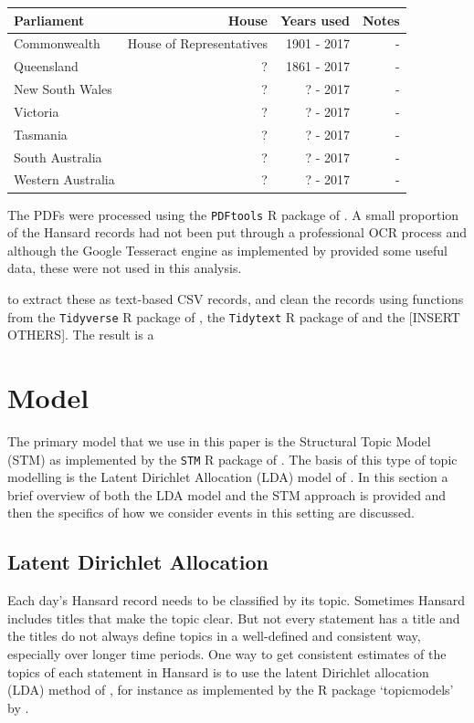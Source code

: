 \documentclass[12pt,]{article}
\begin{document}
\begin{longtable}[]{@{}lrrr@{}}
\toprule
Parliament & House & Years used & Notes\tabularnewline
\midrule
\endhead
Commonwealth & House of Representatives & 1901 - 2017 & -\tabularnewline
Queensland & ? & 1861 - 2017 & -\tabularnewline
New South Wales & ? & ? - 2017 & -\tabularnewline
Victoria & ? & ? - 2017 & -\tabularnewline
Tasmania & ? & ? - 2017 & -\tabularnewline
South Australia & ? & ? - 2017 & -\tabularnewline
Western Australia & ? & ? - 2017 & -\tabularnewline
\bottomrule
\end{longtable}

The PDFs were processed using the \texttt{PDFtools} R package of
\citet{Ooms2018pdftools}. A small proportion of the Hansard records had
not been put through a professional OCR process and although the Google
Tesseract engine as implemented by \citet{Ooms2018tesseract} provided
some useful data, these were not used in this analysis.

to extract these as text-based CSV records, and clean the records using
functions from the \texttt{Tidyverse} R package of
\citet{WickhamHadleyTidyverse}, the \texttt{Tidytext} R package of
\citet{SilgeRobinson2016} and the {[}INSERT OTHERS{]}. The result is a

\section{Model}\label{model}

The primary model that we use in this paper is the Structural Topic
Model (STM) as implemented by the \texttt{STM} R package of
\citet{RobertsStewartAiroldiRPackage}. The basis of this type of topic
modelling is the Latent Dirichlet Allocation (LDA) model of
\citet{Blei2003latent}. In this section a brief overview of both the LDA
model and the STM approach is provided and then the specifics of how we
consider events in this setting are discussed.

\subsection{Latent Dirichlet
Allocation}\label{latent-dirichlet-allocation}

Each day's Hansard record needs to be classified by its topic. Sometimes
Hansard includes titles that make the topic clear. But not every
statement has a title and the titles do not always define topics in a
well-defined and consistent way, especially over longer time periods.
One way to get consistent estimates of the topics of each statement in
Hansard is to use the latent Dirichlet allocation (LDA) method of
\citet{Blei2003latent}, for instance as implemented by the R package
`topicmodels' by \citet{Grun2011}.
\end{document}
